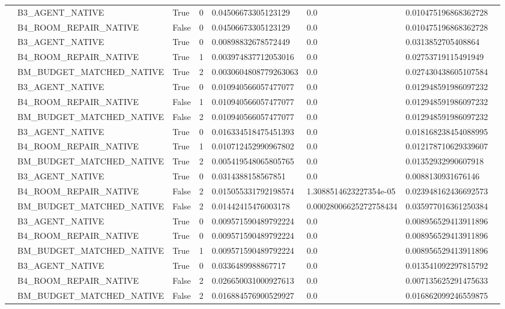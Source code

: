 \begin{tabular}{llllllll}
 & B3\_AGENT\_NATIVE & True & 0 & 0.04506673305123129 & 0.0 & 0.010475196868362728 &  \\
 & B4\_ROOM\_REPAIR\_NATIVE & False & 0 & 0.04506673305123129 & 0.0 & 0.010475196868362728 &  \\
 & B3\_AGENT\_NATIVE & True & 0 & 0.00898832678572449 & 0.0 & 0.0313852705408864 &  \\
 & B4\_ROOM\_REPAIR\_NATIVE & True & 1 & 0.003974837712053016 & 0.0 & 0.02753719115491949 &  \\
 & BM\_BUDGET\_MATCHED\_NATIVE & True & 2 & 0.0030604808779263063 & 0.0 & 0.027430438605107584 &  \\
 & B3\_AGENT\_NATIVE & True & 0 & 0.010940566057477077 & 0.0 & 0.012948591986097232 &  \\
 & B4\_ROOM\_REPAIR\_NATIVE & False & 1 & 0.010940566057477077 & 0.0 & 0.012948591986097232 &  \\
 & BM\_BUDGET\_MATCHED\_NATIVE & False & 2 & 0.010940566057477077 & 0.0 & 0.012948591986097232 &  \\
 & B3\_AGENT\_NATIVE & True & 0 & 0.016334518475451393 & 0.0 & 0.018168238454088995 &  \\
 & B4\_ROOM\_REPAIR\_NATIVE & True & 1 & 0.010712452990967802 & 0.0 & 0.012178710629339607 &  \\
 & BM\_BUDGET\_MATCHED\_NATIVE & True & 2 & 0.005419548065805765 & 0.0 & 0.01352932990607918 &  \\
 & B3\_AGENT\_NATIVE & True & 0 & 0.0314388158567851 & 0.0 & 0.0088130931676146 &  \\
 & B4\_ROOM\_REPAIR\_NATIVE & False & 2 & 0.015055331792198574 & 1.3088514623227354e-05 & 0.023948162436692573 &  \\
 & BM\_BUDGET\_MATCHED\_NATIVE & False & 2 & 0.01442415476003178 & 0.00028006625272758434 & 0.035977016361250384 &  \\
 & B3\_AGENT\_NATIVE & True & 0 & 0.009571590489792224 & 0.0 & 0.008956529413911896 &  \\
 & B4\_ROOM\_REPAIR\_NATIVE & True & 0 & 0.009571590489792224 & 0.0 & 0.008956529413911896 &  \\
 & BM\_BUDGET\_MATCHED\_NATIVE & True & 1 & 0.009571590489792224 & 0.0 & 0.008956529413911896 &  \\
 & B3\_AGENT\_NATIVE & True & 0 & 0.0336489988867717 & 0.0 & 0.013541092297815792 &  \\
 & B4\_ROOM\_REPAIR\_NATIVE & False & 2 & 0.026650031000927613 & 0.0 & 0.007135625291475633 &  \\
 & BM\_BUDGET\_MATCHED\_NATIVE & False & 2 & 0.016884576900529927 & 0.0 & 0.016862099246559875 &  \\
\end{tabular}
